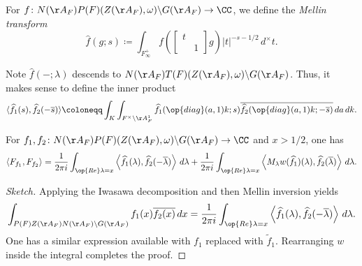 \documentclass{article}
\begin{document}
\begin{notation}
	For $f\colon N(\AA_F)P(F)(Z(\AA_F),\omega)\backslash G(\AA_F)\to\CC$, we define the \textit{Mellin transform}
	\[\widehat f(g;s)\coloneqq\int_{F_\infty^+}f\left(\begin{bmatrix}
		t \\ & 1
	\end{bmatrix}g\right)\left|t\right|^{-s-1/2}\,d^\times t.\]
\end{notation}
\begin{remark}
	Note $\widehat f(-;\lambda)$ descends to $N(\AA_F)T(F)(Z(\AA_F),\omega)\backslash G(\AA_F)$. Thus, it makes sense to define the inner product
	\[\langle\widehat f_1(s),\widehat f_2(-\overline s)\rangle\coloneqq\int_{K}\int_{F^\times\backslash\AA_F^1}\widehat f_1(\op{diag}(a,1)k;s)\overline{\widehat f_2(\op{diag}(a,1)k;-\overline s)}\,da\,dk.\]
\end{remark}
\begin{proposition}
	For $f_1,f_2\colon N(\AA_F)P(F)(Z(\AA_F),\omega)\backslash G(\AA_F)\to\CC$ and $x>1/2$, one has
	\[\langle F_{f_1},F_{f_2}\rangle=\frac1{2\pi i}\int_{\op{Re}\lambda=x}\left\langle\widehat f_1(\lambda),\widehat f_2(-\overline\lambda)\right\rangle\,d\lambda+\frac1{2\pi i}\int_{\op{Re}\lambda=x}\left\langle M_\lambda w(\widehat f_1)(\lambda),\widehat f_2(\overline\lambda)\right\rangle\,d\lambda.\]
\end{proposition}
\begin{proof}[Sketch]
	Applying the Iwasawa decomposition and then Mellin inversion yields
	\[\int_{P(F)Z(\AA_F)N(\AA_F)\backslash G(\AA_F)}f_1(x)\overline{f_2(x)}\,dx=\frac1{2\pi i}\int_{\op{Re}\lambda=x}\left\langle\widehat f_1(\lambda),\widehat f_2(-\overline\lambda)\right\rangle\,d\lambda.\]
	One has a similar expression available with $f_1$ replaced with $\widetilde f_1$. Rearranging $w$ inside the integral completes the proof.
\end{proof}
\end{document}
